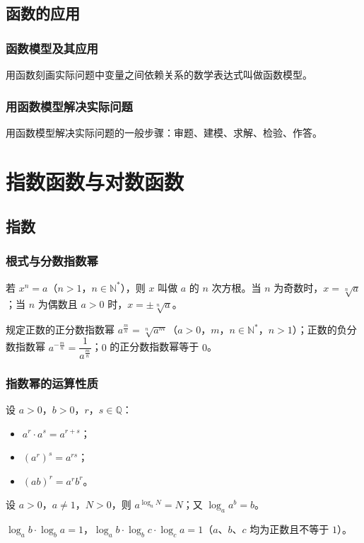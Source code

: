 \documentclass[lang=cn,newtx,10pt,scheme=chinese,nofont]{elegantbook}
\begin{document}
\section{函数的应用}
\subsection{函数模型及其应用}
\begin{definition}[函数模型]
用函数刻画实际问题中变量之间依赖关系的数学表达式叫做函数模型。
\end{definition}
\subsection{用函数模型解决实际问题}
\begin{definition}[用函数模型解题]
用函数模型解决实际问题的一般步骤：审题、建模、求解、检验、作答。
\end{definition}

\chapter{指数函数与对数函数}

\section{指数}
\subsection{根式与分数指数幂}
\begin{definition}[根式]
若 $x^n=a$（$n>1$，$n \in \mathbb{N}^*$），则 $x$ 叫做 $a$ 的 $n$ 次方根。当 $n$ 为奇数时，$x=\sqrt[n]{a}$；当 $n$ 为偶数且 $a>0$ 时，$x=\pm\sqrt[n]{a}$。
\end{definition}
\begin{definition}[分数指数幂]
规定正数的正分数指数幂 $a^{\frac{m}{n}}=\sqrt[n]{a^m}$（$a>0$，$m$，$n \in \mathbb{N}^*$，$n>1$）；正数的负分数指数幂 $a^{-\frac{m}{n}}=\dfrac{1}{a^{\frac{m}{n}}}$；$0$ 的正分数指数幂等于 $0$。
\end{definition}
\subsection{指数幂的运算性质}
\begin{definition}[指数幂的运算性质]
设 $a>0$，$b>0$，$r$，$s \in \mathbb{Q}$：
\begin{itemize}
    \item $a^r \cdot a^s=a^{r+s}$；
    \item $(a^r)^s=a^{rs}$；
    \item $(ab)^r=a^r b^r$。
\end{itemize}
\end{definition}
\begin{theorem}[对数恒等式]
设 $a>0$，$a \neq 1$，$N>0$，则 $a^{\log_a N}=N$；又 $\log_a a^b=b$。
\end{theorem}
\begin{corollary}[对数换底推论]
$\log_a b \cdot \log_b a=1$，$\log_a b \cdot \log_b c \cdot \log_c a=1$（$a$、$b$、$c$ 均为正数且不等于 $1$）。
\end{corollary}
\end{document}
